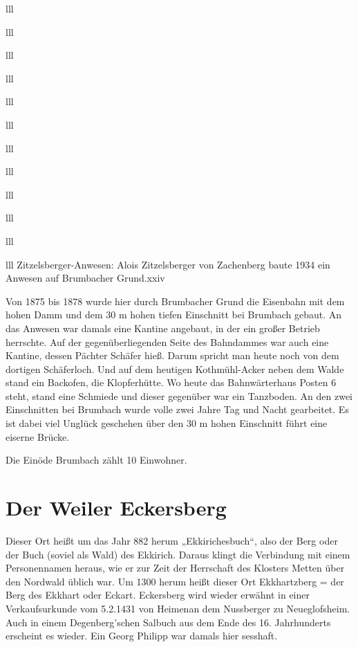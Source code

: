 \documentclass[12pt,a4pager]{book}
\begin{document}
\begin{tabuluar}{lll}
\begin{tabuluar}{lll}
\begin{tabuluar}{lll}
\begin{tabuluar}{lll}
\begin{tabuluar}{lll}
\begin{tabuluar}{lll}
\begin{tabuluar}{lll}
\begin{tabuluar}{lll}
\begin{tabuluar}{lll}
\begin{tabuluar}{lll}
\begin{tabuluar}{lll}
\begin{tabuluar}{lll}
Zitzelsberger-Anwesen: Alois Zitzelsberger von Zachenberg baute 1934 ein Anwesen
auf Brumbacher Grund.xxiv

Von 1875 bis 1878 wurde hier durch Brumbacher Grund die Eisenbahn mit dem hohen
Damm und dem 30 m hohen tiefen Einschnitt bei Brumbach gebaut. An das Anwesen
war damals eine Kantine angebaut, in der ein großer Betrieb herrschte. Auf der
gegenüberliegenden Seite des Bahndammes war auch eine Kantine, dessen Pächter
Schäfer hieß. Darum spricht man heute noch von dem dortigen Schäferloch. Und auf
dem heutigen Kothmühl-Acker neben dem Walde stand ein Backofen, die
Klopferhütte. Wo heute das Bahnwärterhaus Posten 6 steht, stand eine Schmiede
und dieser gegenüber war ein Tanzboden. An den zwei Einschnitten bei Brumbach
wurde volle zwei Jahre Tag und Nacht gearbeitet. Es ist dabei viel Unglück
geschehen über den 30 m hohen Einschnitt führt eine eiserne Brücke.

Die Einöde Brumbach zählt 10 Einwohner.

\section{Der Weiler Eckersberg}

Dieser Ort heißt um das Jahr 882 herum „Ekkirichesbuch“, also der Berg oder der
Buch (soviel als Wald) des Ekkirich. Daraus klingt die Verbindung mit einem
Personennamen heraus, wie er zur Zeit der Herrschaft des Klosters Metten über
den Nordwald üblich war. Um 1300 herum heißt dieser Ort Ekkhartzberg = der Berg
des Ekkhart oder Eckart. Eckersberg wird wieder erwähnt in einer Verkaufsurkunde
vom 5.2.1431 von Heimenan dem Nussberger zu Neueglofsheim. Auch in einem
Degenberg'schen Salbuch aus dem Ende des 16. Jahrhunderts erscheint es wieder.
Ein Georg Philipp war damals hier sesshaft.


\end{tabuluar}
\end{tabuluar}
\end{tabuluar}
\end{tabuluar}
\end{tabuluar}
\end{tabuluar}
\end{tabuluar}
\end{tabuluar}
\end{tabuluar}
\end{tabuluar}
\end{tabuluar}
\end{tabuluar}
\end{document}
